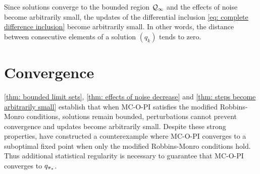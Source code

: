 Since solutions converge to the bounded region $\mathcal{Q}_\infty$ and the effects of noise become arbitrarily small, the updates of the differential inclusion \eqref{eq: complete difference inclusion} become arbitrarily small. In other words, the distance between consecutive elements of a solution $(q_k)$ tends to zero.







% 



\section{Convergence}
\label{sec: existing convergence proofs}


\autoref{thm: bounded limit sets}, \autoref{thm: effects of noise decrease} and \autoref{thm: steps become arbitrarily small} establish that when MC-O-PI satisfies the modified Robbins-Monro conditions, solutions remain bounded, perturbations cannot prevent convergence and updates become arbitrarily small.
Despite these strong properties, \cite{Bertsekas1996Neuro-DynamicProgramming} have constructed a counterexample where MC-O-PI converges to a suboptimal fixed point when only the modified Robbins-Monro conditions hold.
Thus additional statistical regularity is necessary to guarantee that MC-O-PI converges to $q_{{\pi}_*}$.

